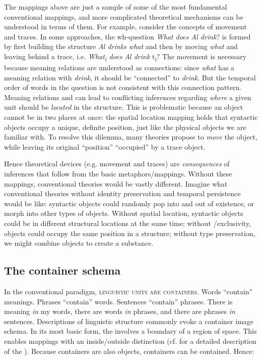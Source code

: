   The mappings above are just a sample of some of the most fundamental conventional mappings, and more complicated theoretical mechanisms can be understood in terms of them. For example, consider the concepts of movement and traces. In some approaches, the wh-question \textit{What does Al drink}? is formed by first building the structure \textit{Al drinks what} and then by moving \textit{what} and leaving behind a trace, i.e. \textit{What\textsubscript{i} does Al drink} t\textsubscript{i}? The movement is necessary because meaning relations are understood as connections: since \textit{what} has a meaning relation with \textit{drink}, it should be “connected” to \textit{drink}. But the temporal order of words in the question is not consistent with this connection pattern. Meaning relations and  can lead to conflicting inferences regarding \textit{where} a given unit should be \textit{located} in the structure. This is problematic because an object cannot be in two places at once: the spatial location mapping holds that syntactic objects occupy a unique, definite position, just like the physical objects we are familiar with. To resolve this dilemma, many theories propose to \textit{move} the object, while leaving its original “position” “occupied” by a trace object.

  Hence theoretical devices (e.g. movement and traces) are \textit{consequences} of inferences that follow from the basic metaphors/mappings. Without these mappings, conventional theories would be vastly different. Imagine what conventional theories without identity preservation and temporal persistence would be like: syntactic objects could randomly pop into and out of existence, or morph into other types of objects. Without spatial location, syntactic objects could be in different structural locations at the same time; without /exclusivity, objects could occupy the same position in a structure; without type preservation, we might combine objects to create a substance.

\subsection{The container schema} 

In the conventional paradigm, \textsc{linguistic units are containers}. Words “contain” meanings. Phrases “contain” words. Sentences “contain” phrases. There is meaning \textit{in} my words, there are words \textit{in} phrases, and there are phrases \textit{in} sentences. Descriptions of linguistic structure commonly evoke a container image schema. In its most basic form, the  involves a boundary of a region of space. This enables mappings with an inside/outside distinction (cf. \citet{LakoffNúñez2000} for a detailed description of the ). Because containers are also objects, containers can be contained. Hence:

